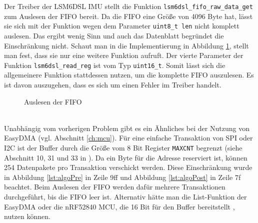 Der Treiber der LSM6DSL IMU stellt die Funktion \texttt{lsm6dsl\_fifo\_raw\_data\_get} zum Auslesen der FIFO bereit.
Da die FIFO eine Größe von 4096 Byte hat, lässt sie sich mit der Funktion wegen dem Parameter \texttt{uint8\_t len} nicht komplett auslesen.
Das ergibt wenig Sinn und auch das Datenblatt begründet die Einschränkung nicht.
Schaut man in die Implementierung in Abbildung \ref{lst:fifoRead}, stellt man fest, dass sie nur eine weitere Funktion aufruft.
Der vierte Parameter der Funktion \texttt{lsm6dsl\_read\_reg} ist vom Typ \texttt{uint16\_t}.
Somit lässt sich die allgemeinere Funktion stattdessen nutzen, um die komplette FIFO auszulesen.
Es ist davon auszugehen, dass es sich um einen Fehler im Treiber handelt.
\begin{figure}[hbtp]
	
	\caption{Auslesen der FIFO}
	\label{lst:fifoRead}
\end{figure}\\
Unabhängig vom vorherigen Problem gibt es ein Ähnliches bei der Nutzung von EasyDMA (vgl. Abschnitt \ref{ch:mcu}).
Für eine einfache Transaktion von SPI oder I2C ist der Buffer durch die Größe vom 8 Bit Register \texttt{MAXCNT} begrenzt (siehe Abschnitt 10, 31 und 33 in \cite{datasheet_nrf52832}).
Da ein Byte für die Adresse reserviert ist, können 254 Datenpakete pro Transaktion verschickt werden.
Diese Einschränkung wurde in Abbildung \ref{lst:algoPre} in Zeile 9ff und Abbildung \ref{lst:algoPost} in Zeile 7f beachtet.
Beim Auslesen der FIFO werden dafür mehrere Transaktionen durchgeführt, bis die FIFO leer ist.
Alternativ hätte man die List-Funktion der EasyDMA oder die nRF52840 MCU, die 16 Bit für den Buffer bereitstellt \cite{datasheet_nrf52840}, nutzen können.

